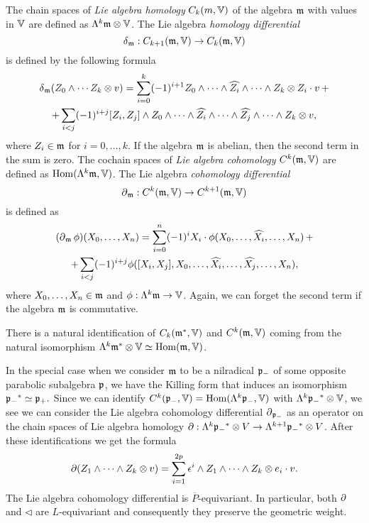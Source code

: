 \documentclass[12pt,a4paper,final]{report}
\begin{document}
The chain spaces of \emph{Lie algebra homology} $C_k(m,\mathbb{V})$ of the algebra $\mathfrak{m}$ with values in $\mathbb{V}$ are defined as $\Lambda^k\mathfrak{m}\otimes\mathbb{V}$. The Lie algebra \emph{homology differential} \[\operatorname{\delta}_{\mathfrak{m}} : C_{k+1}(\mathfrak{m},\mathbb{V}) \to C_k(\mathfrak{m},\mathbb{V})\] is defined by the following formula
\begin{multline*}
\operatorname{\delta}_{\mathfrak{m}} (Z_0\wedge\cdots Z_k\otimes v) = \sum_{i=0}^k (-1)^{i+1} Z_0\wedge\cdots\wedge\widehat{Z_i}\wedge\cdots\wedge Z_k\otimes Z_i\cdot v\,  + \\
				      +\sum_{i<j} (-1)^{i+j} [Z_i,Z_j]\wedge Z_0\wedge\cdots\wedge\widehat{Z_i}\wedge\cdots\wedge\widehat{Z_j}\wedge\cdots\wedge Z_k\otimes v,
\end{multline*}
where $Z_i\in\mathfrak{m}$ for $i=0,\ldots,k$. If the algebra $\mathfrak{m}$ is abelian, then the second term in the sum is zero. The cochain spaces of \emph{Lie algebra cohomology} $C^k(\mathfrak{m},\mathbb{V})$ are defined as $\mathrm{Hom}(\Lambda^k \mathfrak{m},\mathbb{V})$. The Lie algebra \emph{cohomology differential} \[\operatorname{\partial}_{\mathfrak{m}} :  C^k(\mathfrak{m},\mathbb{V}) \to C^{k+1}(\mathfrak{m},\mathbb{V})\] is defined as
\begin{multline*}
 (\operatorname{\partial}_{\mathfrak{m}} \phi)(X_0,\ldots, X_n) = \sum_{i=0}^n (-1)^i X_i \cdot \phi(X_0,\ldots,\widehat{X_i},\ldots, X_n)\, + \\
				+\sum_{i<j} (-1)^{i+j} \phi([X_i,X_j],X_0,\ldots,\widehat{X_i},\ldots,\widehat{X_j},\ldots,X_n),
\end{multline*}
where $X_0,\ldots, X_n \in \mathfrak{m}$ and $\phi:\Lambda^k \mathfrak{m} \to \mathbb{V}$. Again, we can forget the second term if the algebra $\mathfrak{m}$ is commutative.

There is a natural identification of $C_k(\mathfrak{m}^*,\mathbb{V})$ and $C^k(\mathfrak{m},\mathbb{V})$ coming from the natural isomorphism $\Lambda^k \mathfrak{m}^* \otimes \mathbb{V} \simeq \mathrm{Hom}(\mathfrak{m},\mathbb{V})$.

In the special case when we consider $\mathfrak{m}$ to be a nilradical $\mathfrak{p}_-$ of some opposite parabolic subalgebra $\mathfrak{p}$, we have the Killing form that induces an isomorphism ${\mathfrak{p}_-}^* \simeq \mathfrak{p}_+.$ Since we can identify $C^k(\mathfrak{p}_-,\mathbb{V})=\mathrm{Hom} (\Lambda^k\mathfrak{p}_-,\mathbb{V})$ with $\Lambda^k {\mathfrak{p}_-}^*\otimes\mathbb{V}$, we see we can consider the Lie algebra cohomology differential $\operatorname{\partial}_{\mathfrak{p}_-}$ as an operator on the chain spaces of Lie algebra homology $\operatorname{\partial}: \Lambda^k {\mathfrak{p}_-}^* \otimes V \to \Lambda^{k+1}{\mathfrak{p}_-}^*\otimes V$. After these identifications we get the formula
\[
 \operatorname{\partial}  (Z_1\wedge\cdots\wedge Z_k\otimes v) = \sum_{i=1}^{2p} \epsilon^i \wedge Z_1\wedge\cdots\wedge Z_k\otimes e_i\cdot v.
\] The Lie algebra cohomology differential is $\overline{P}$-equivariant. In particular, both $\operatorname{\partial}$ and $\lhd$ are $L$-equivariant and consequently they preserve the geometric weight.
\end{document}
